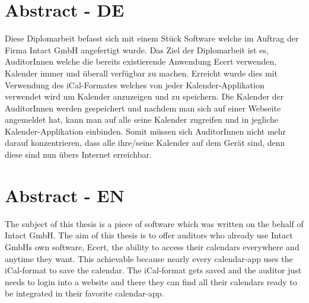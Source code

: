 

\chapter*{Abstract - DE}
\label{cha:abstract}

Diese Diplomarbeit befasst sich mit einem Stück Software welche im Auftrag der Firma Intact GmbH angefertigt wurde. Das Ziel der Diplomarbeit ist es, AuditorInnen welche die bereits existierende Anwendung Ecert verwenden, Kalender immer und überall verfügbar zu machen. Erreicht wurde dies mit Verwendung des iCal-Formates welches von jeder Kalender-Applikation verwendet wird um Kalender anzuzeigen und zu speichern. Die Kalender der AuditorInnen werden gespeichert und nachdem man sich auf einer Webseite angemeldet hat, kann man auf alle seine Kalender zugreifen und in jegliche Kalender-Applikation einbinden. Somit müssen sich AuditorInnen nicht mehr darauf konzentrieren, dass alle ihre/seine Kalender auf dem Gerät sind, denn diese sind nun übers Internet erreichbar. 
\vspace{20px}
\linebreak
\pagebreak

\pagebreak

\chapter*{Abstract - EN}
\label{cha:abstract}
The subject of this thesis is a piece of software which was written on the behalf of Intact GmbH. The aim of this thesis is to offer auditors who already use Intact GmbHs own software, Ecert, the ability to access their calendars everywhere and anytime they want. This achievable because nearly every calendar-app uses the iCal-format to save the calendar. The iCal-format gets saved and the auditor just needs to login into a website and there they can find all their calendars ready to be integrated in their favorite calendar-app.

